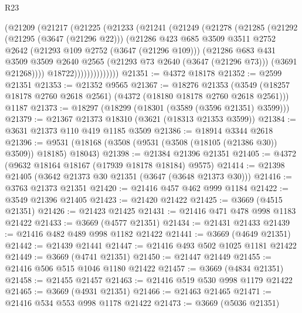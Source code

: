 \begin{lexlean}{R23}
\begin{coremodule}
                (@21209
                  (@21217
                    (@21225
                      (@21233
                        (@21241
                          (@21249
                            (@21278
                              (@21285
                                (@21292
                                  (@21295 (@3647 (@21296 @22)))
                                  (@21286
                                    @423
                                    @685
                                    @3509
                                    @3511
                                    @2752
                                    @2642
                                    (@21293 @109 @2752 (@3647 (@21296 @109)))
                                    (@21286
                                      @683
                                      @431
                                      @3509
                                      @3509
                                      @2640
                                      @2565
                                      (@21293 @73 @2640 (@3647 (@21296 @73)))
                                      (@3691 @21268))))
                                @18722))))))))))))))
@21351 := @4372 @18178
@21352 := @2599 @21351
@21353 := @21352 @9565
@21367 := @18276
    @21353
    (@3549 (@18257 @18178 @2760 @2618 @2561) (@4372 (@18180 @18178 @2760 @2618 @2561)))
    @1187
@21373 := @18297 (@18299 (@18301 (@3589 (@3596 @21351) @3599)))
@21379 := @21367 @21373 @18310 (@3621 (@18313 @21353 @3599))
@21384 := @3631 @21373 @110 @419 @1185 @3509
@21386 := @18914 @3344 @2618
@21396 := @9531 (@18168 (@3508 (@9531 (@3508 (@18105 (@21386 @30)) @3509)) @18185) @18043)
@21398 := @21384 @21396 @21351
@21405 := @4372 (@9632 @18164 @18167 (@17939 @18178 @18184) @9575)
@21414 := @21398 @21405 (@3642 @21373 @30 @21351 (@3647 (@3648 @21373 @30)))
@21416 := @3763 @21373 @21351
@21420 := @21416 @457 @462 @999 @1184
@21422 := @3549 @21396 @21405
@21423 := @21420 @21422
@21425 := @3669 (@4515 @21351)
@21426 := @21423 @21425
@21431 := @21416 @471 @478 @998 @1183 @21422
@21433 := @3669 (@4577 @21351)
@21434 := @21431 @21433
@21439 := @21416 @482 @489 @998 @1182 @21422
@21441 := @3669 (@4649 @21351)
@21442 := @21439 @21441
@21447 := @21416 @493 @502 @1025 @1181 @21422
@21449 := @3669 (@4741 @21351)
@21450 := @21447 @21449
@21455 := @21416 @506 @515 @1046 @1180 @21422
@21457 := @3669 (@4834 @21351)
@21458 := @21455 @21457
@21463 := @21416 @519 @530 @998 @1179 @21422
@21465 := @3669 (@4931 @21351)
@21466 := @21463 @21465
@21471 := @21416 @534 @553 @998 @1178 @21422
@21473 := @3669 (@5036 @21351)

\end{coremodule}
\end{lexlean}
